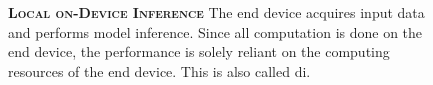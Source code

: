 \begin{figure}
	\begin{minipage}{0.65\linewidth}
		\textbf{\protect{} \textsc{Local on-Device Inference}}
		\color{caption-color} \newline
		The end device acquires input data and performs model inference. Since all computation is done on the end device, the performance is solely reliant on the computing resources of the end device. This is also called \acrlong{di}.
	\end{minipage}%
	\hfill
	\begin{minipage}{0.3\linewidth}
		\centering
		\captionsetup[subfigure]{justification=centering}
		\begin{figure}
			\centering
		\end{figure}
	\end{minipage}
	

\end{figure}
